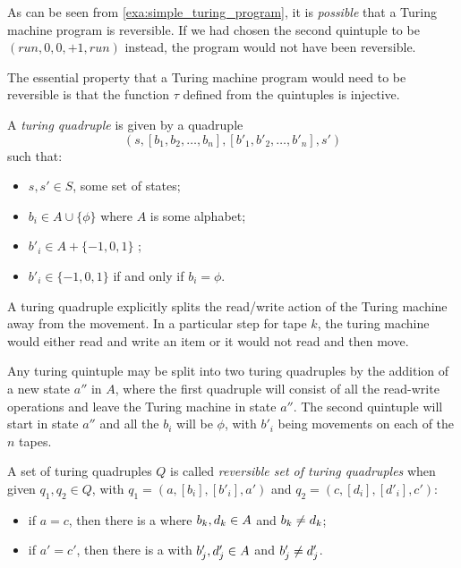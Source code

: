 As can be seen from \ref{exa:simple_turing_program}, it is \emph{possible}
that a Turing machine program is reversible. If we had chosen the second
quintuple to be $(run,0,0,+1,run)$ instead, the program would not have been
reversible.

The essential property that a Turing machine program would need to be reversible
is that the function $\tau$ defined from the quintuples is injective.

\begin{definition}\label{def:turing_quadruple}
  A \emph{turing quadruple} is given by a quadruple
  \[(s,[b_1,b_2,\ldots,b_n],[b'_1,b'_2,\ldots,b'_n],s')\]
  such that:
  \begin{itemize}
    \item $s,s'\in S$, some set of states;
    \item $b_i\in A  \cup \{\phi\}$ where $A$ is some alphabet;
    \item $b'_i\in A  + \{-1,0,1\}$ ;
    \item $b'_i \in \{-1,0,1\}$ if and only if $b_i = \phi$.
  \end{itemize}
\end{definition}

A turing quadruple explicitly splits the read/write action of the
Turing machine away from the movement. In a particular step for
tape $k$, the
turing machine would either read and write an item or it would not
read and then move.

Any turing quintuple may be split into two
turing quadruples by the addition of a new state $a''$ in $A$, where the
first quadruple will consist of all the read-write operations and
leave the Turing machine in state $a''$. The second quintuple will start
in state $a''$ and all the $b_i$ will be $\phi$, with $b'_i$ being
movements on each of the $n$ tapes.

\begin{definition}\label{def:reversible_turing_quadruple}
  A set of turing quadruples $Q$ is called \emph{reversible set of turing
  quadruples} when given $q_1,q_2\in Q$, with $q_1=(a,[b_i], [b'_i], a')$ and
  $q_2=(c,[d_i], [d'_i], c')$:
\begin{itemize}
  \item  if $a=c$, then there is a \kay where $b_k, d_k \in A$ and
    $b_k \ne d_k$;
  \item if $a' = c'$, then there is a \jay with $b'_j, d'_j \in A$ and
    $b'_j \ne d'_j$.
\end{itemize}
\end{definition}


